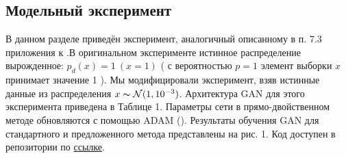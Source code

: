 \documentclass[preprint,12pt]{elsarticle}
\begin{document}
\subsection{Модельный эксперимент}

В данном разделе приведён эксперимент, аналогичный описанному в  п. 7.3 приложения к \cite{chen2018training}.В оригинальном эксперименте истинное распределение вырожденное: $p_d (x) = 1 \ ( x =1 )$ ( с вероятностью $p =1 $ элемент выборки $x$ принимает значение 1 ). Мы модифицировали эксперимент, взяв истинные данные из распределения $x \thicksim \mathcal{N} (1, 10^{-3})$. 
Архитектура GAN для этого эксперимента приведена в Таблице 1. 
Параметры сети в прямо-двойственном методе обновляются с помощью ADAM (\cite{chen2018training}).
Результаты обучения GAN для стандартного и предложенного метода
представлены на рис. 1. 
Код доступен в репозитории по \href{https://github.com/yk4r2/GAN/blob/master/toy_example.ipynb}{ссылке}.
\end{document}
